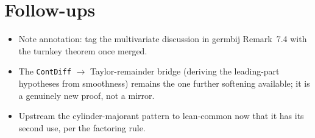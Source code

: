 \documentclass[11pt]{article}
\begin{document}
\section{Follow-ups}

\begin{itemize}
\item Note annotation: tag the multivariate discussion in germbij
Remark~7.4 with the turnkey theorem once merged.
\item The \texttt{ContDiff} $\to$ Taylor-remainder bridge (deriving the
leading-part hypotheses from smoothness) remains the one further softening
available; it is a genuinely new proof, not a mirror.
\item Upstream the cylinder-majorant pattern to lean-common now that it
has its second use, per the factoring rule.
\end{itemize}
\end{document}
